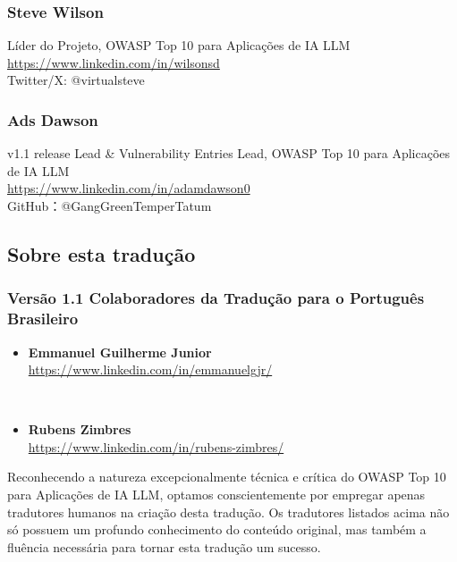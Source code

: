 \documentclass[
]{article}
\providecommand{\tightlist}{%
  \setlength{\itemsep}{0pt}\setlength{\parskip}{0pt}}
\begin{document}
\subsubsection{Steve Wilson}\label{steve-wilson}

Líder do Projeto, OWASP Top 10 para Aplicações de IA LLM\\
\href{https://www.linkedin.com/in/wilsonsd/}{https://www.linkedin.com/in/wilsonsd}\\
Twitter/X: @virtualsteve

\subsubsection{Ads Dawson}\label{ads-dawson}

v1.1 release Lead \& Vulnerability Entries Lead, OWASP Top 10 para
Aplicações de IA LLM\\
\href{https://www.linkedin.com/in/adamdawson0/}{https://www.linkedin.com/in/adamdawson0}\\
GitHub：@GangGreenTemperTatum

\subsection{Sobre esta tradução}\label{sobre-esta-traduuxe7uxe3o}

\subsubsection{Versão 1.1 Colaboradores da Tradução para o Português
Brasileiro}\label{versuxe3o-1.1-colaboradores-da-traduuxe7uxe3o-para-o-portuguuxeas-brasileiro}

\begin{itemize}
\tightlist
\item
  \textbf{Emmanuel Guilherme Junior}\\
  \url{https://www.linkedin.com/in/emmanuelgjr/}\strut \\
\item
  \textbf{Rubens Zimbres}\\
  \url{https://www.linkedin.com/in/rubens-zimbres/}
\end{itemize}

Reconhecendo a natureza excepcionalmente técnica e crítica do OWASP Top
10 para Aplicações de IA LLM, optamos conscientemente por empregar
apenas tradutores humanos na criação desta tradução. Os tradutores
listados acima não só possuem um profundo conhecimento do conteúdo
original, mas também a fluência necessária para tornar esta tradução um
sucesso.
\end{document}
